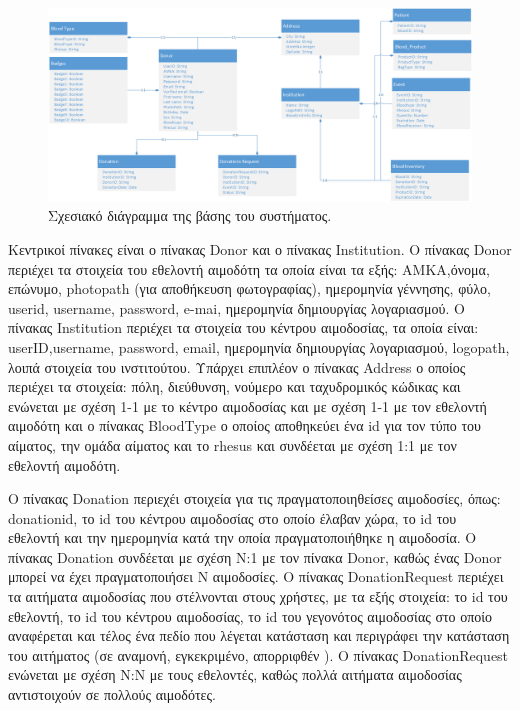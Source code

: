 	\begin{figure}[H]
	    \centering
	    \includegraphics[width=1\textwidth]{Class_Diagram.png}
	    \caption{Σχεσιακό διάγραμμα της βάσης του συστήματος.}
	    \label{fig:database_diag}
	\end{figure}
	
		Κεντρικοί πίνακες είναι ο πίνακας Donor και ο πίνακας Institution. Ο πίνακας Donor περιέχει τα στοιχεία του εθελοντή αιμοδότη τα οποία είναι τα εξής: ΑΜΚΑ,όνομα, επώνυμο, photopath (για αποθήκευση φωτογραφίας), ημερομηνία γέννησης, φύλο, userid, username, password, e-mai, ημερομηνία δημιουργίας λογαριασμού. Ο πίνακας Institution περιέχει τα στοιχεία του κέντρου αιμοδοσίας, τα οποία είναι: userID,username, password, email, ημερομηνία δημιουργίας λογαριασμού, logopath, λοιπά στοιχεία του ινστιτούτου. Υπάρχει επιπλέον ο πίνακας Address ο οποίος περιέχει τα στοιχεία: πόλη, διεύθυνση, νούμερο και ταχυδρομικός κώδικας και ενώνεται με σχέση 1-1 με το κέντρο αιμοδοσίας και με σχέση 1-1 με τον εθελοντή αιμοδότη και ο πίνακας BloodType  ο οποίος αποθηκεύει ένα id για τον τύπο του αίματος, την ομάδα αίματος και το rhesus και συνδέεται με σχέση 1:1 με τον εθελοντή αιμοδότη.
	
		Ο πίνακας Donation περιεχέι στοιχεία για τις πραγματοποιηθείσες αιμοδοσίες, όπως: donationid, το id του κέντρου αιμοδοσίας στο οποίο έλαβαν χώρα, το id του εθελοντή και την ημερομηνία κατά την οποία πραγματοποιήθηκε η αιμοδοσία. Ο πίνακας Donation συνδέεται με σχέση N:1 με τον πίνακα Donor, καθώς ένας Donor μπορεί να έχει πραγματοποιήσει N αιμοδοσίες. Ο πίνακας DonationRequest περιέχει τα αιτήματα αιμοδοσίας που στέλνονται στους χρήστες, με τα εξής στοιχεία: το id του εθελοντή, το id του κέντρου αιμοδοσίας, το id του γεγονότος αιμοδοσίας στο οποίο αναφέρεται  και τέλος ένα πεδίο που λέγεται κατάσταση και περιγράφει την κατάσταση του αιτήματος (σε αναμονή, εγκεκριμένο, απορριφθέν ). Ο πίνακας DonationRequest ενώνεται με σχέση Ν:Ν με τους εθελοντές, καθώς πολλά αιτήματα αιμοδοσίας αντιστοιχούν σε πολλούς αιμοδότες.
	
